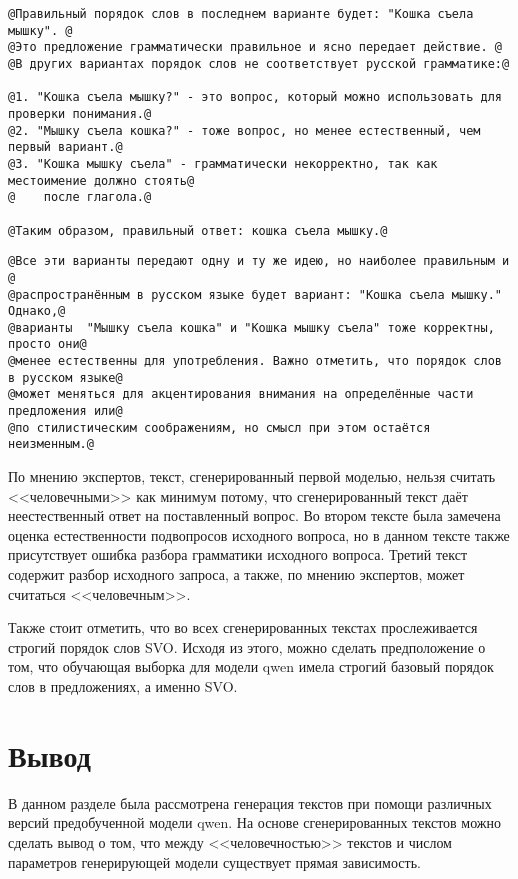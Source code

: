 \begin{lstlisting}[label=lst:4,caption=Текст\, сгенерированный моделью qwen2.5:7b]
@Правильный порядок слов в последнем варианте будет: "Кошка съела мышку". @
@Это предложение грамматически правильное и ясно передает действие. @
@В других вариантах порядок слов не соответствует русской грамматике:@

@1. "Кошка съела мышку?" - это вопрос, который можно использовать для проверки понимания.@
@2. "Мышку съела кошка?" - тоже вопрос, но менее естественный, чем первый вариант.@
@3. "Кошка мышку съела" - грамматически некорректно, так как местоимение должно стоять@
@    после глагола.@

@Таким образом, правильный ответ: кошка съела мышку.@
\end{lstlisting}

\begin{lstlisting}[label=lst:5,caption=Текст\, сгенерированный моделью qwen2.5:14b]
@Все эти варианты передают одну и ту же идею, но наиболее правильным и @
@распространённым в русском языке будет вариант: "Кошка съела мышку." Однако,@
@варианты  "Мышку съела кошка" и "Кошка мышку съела" тоже корректны, просто они@
@менее естественны для употребления. Важно отметить, что порядок слов в русском языке@
@может меняться для акцентирования внимания на определённые части предложения или@
@по стилистическим соображениям, но смысл при этом остаётся неизменным.@
\end{lstlisting}

По мнению экспертов, текст, сгенерированный первой моделью, нельзя считать <<человечными>> как минимум потому, что сгенерированный текст даёт неестественный ответ на поставленный вопрос. Во втором тексте была замечена оценка естественности подвопросов исходного вопроса, но в данном тексте также присутствует ошибка разбора грамматики исходного вопроса. Третий текст содержит разбор исходного запроса, а также, по мнению экспертов, может считаться <<человечным>>.

Также стоит отметить, что во всех сгенерированных текстах прослеживается строгий порядок слов SVO. Исходя из этого, можно сделать предположение о том, что обучающая выборка для модели qwen имела строгий базовый порядок слов в предложениях, а именно SVO.

\section*{Вывод}

В данном разделе была рассмотрена генерация текстов при помощи различных версий предобученной модели qwen. На основе сгенерированных текстов можно сделать вывод о том, что между <<человечностью>> текстов и числом параметров генерирующей модели существует прямая зависимость.

\clearpage
